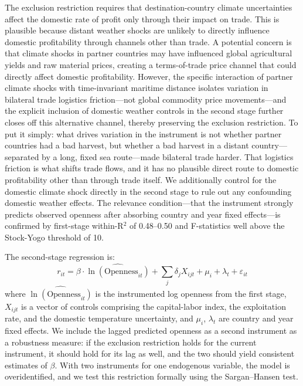 \documentclass[10pt]{article}
\begin{document}
\par The exclusion restriction requires that destination-country climate uncertainties affect the domestic rate of profit only through their impact on trade. This is plausible because distant weather shocks are unlikely to directly influence domestic profitability through channels other than trade. A potential concern is that climate shocks in partner countries may have influenced global agricultural yields and raw material prices, creating a terms-of-trade price channel that could directly affect domestic profitability. However, the specific interaction of partner climate shocks with time-invariant maritime distance isolates variation in bilateral trade logistics friction---not global commodity price movements---and the explicit inclusion of domestic weather controls in the second stage further closes off this alternative channel, thereby preserving the exclusion restriction. To put it simply: what drives variation in the instrument is not whether partner countries had a bad harvest, but whether a bad harvest in a distant country---separated by a long, fixed sea route---made bilateral trade harder. That logistics friction is what shifts trade flows, and it has no plausible direct route to domestic profitability other than through trade itself. We additionally control for the domestic climate shock directly in the second stage to rule out any confounding domestic weather effects. The relevance condition---that the instrument strongly predicts observed openness after absorbing country and year fixed effects---is confirmed by first-stage within-R$^2$ of 0.48--0.50 and F-statistics well above the Stock-Yogo threshold of 10.

\par The second-stage regression is:
\begin{equation}
r_{it} = \beta \cdot \widehat{\ln(\text{Openness}_{it})} + \sum_j \delta_j X_{ijt} + \mu_i + \lambda_t + \varepsilon_{it}
\label{eq:iv_second_stage}
\end{equation}
where $\widehat{\ln(\text{Openness}_{it})}$ is the instrumented log openness from the first stage, $X_{ijt}$ is a vector of controls comprising the capital-labor index, the exploitation rate, and the domestic temperature uncertainty, and $\mu_i$, $\lambda_t$ are country and year fixed effects. We include the lagged predicted openness as a second instrument as a robustness measure: if the exclusion restriction holds for the current instrument, it should hold for its lag as well, and the two should yield consistent estimates of $\beta$. With two instruments for one endogenous variable, the model is overidentified, and we test this restriction formally using the Sargan--Hansen test.
\end{document}
